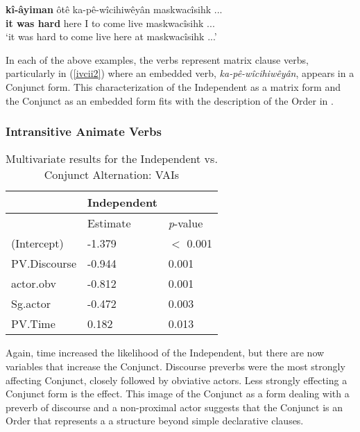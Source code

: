         \begin{exe}
    \ex
    \gll \textbf{kî-âyiman} ôtê ka-pê-wîcihiwêyân maskwacîsihk ...\\
         {\textbf{it was hard}} here {I to come live} maskwacîsihk ... \\
    \trans `it was hard to come live here at maskwacîsihk ...'  \citep[2]{Minde1997kwayask}
    \label{ivcii2}
    \end{exe}
            
    
    In each of the above examples, the verbs represent matrix clause verbs, particularly in (\ref{ivcii2}) where an embedded verb, \textit{ka-pê-wîcihiwêyân}, appears in a Conjunct form. This characterization of the Independent as a matrix form and the Conjunct as an embedded form fits with the description of the Order in \citet{Cook2008}. 

    \subsubsection{Intransitive Animate Verbs}
    
        \begin{table}[H]
        \centering
        \begin{tabular}{lll}
    \toprule
            & \textbf{Independent} & \\
                    \midrule
            & Estimate & \textit{p}-value \\
    \midrule
(Intercept)  & -1.379 & $<$ 0.001 \\
PV.Discourse & -0.944 & 0.001 \\
actor.obv    & -0.812 & 0.001 \\
Sg.actor     & -0.472 & 0.003 \\
PV.Time      & 0.182 & 0.013\\
        \bottomrule
        \end{tabular}
        \caption{
           Multivariate results for the Independent vs. Conjunct Alternation: VAIs \\ \label{tab:aiivcmv}
          }
        \end{table}
        
Again, time increased the likelihood of the Independent, but there are now variables that increase the Conjunct. Discourse preverbs were the most strongly affecting Conjunct, closely followed by obviative actors. Less strongly effecting a Conjunct form is the  effect. This image of the Conjunct as a form dealing with a preverb of discourse and a non-proximal actor suggests that the Conjunct is an Order that represents a a structure beyond simple declarative clauses.


